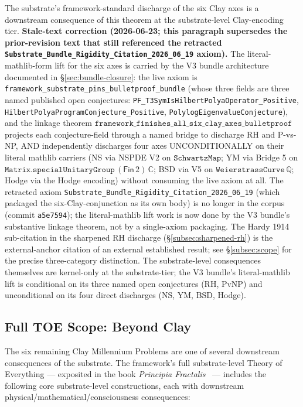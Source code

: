 \documentclass[11pt,a4paper]{amsart}
\theoremstyle{plain}
\theoremstyle{definition}
\begin{document}
The substrate's framework-standard discharge of the six Clay axes is a downstream consequence of this theorem at the substrate-level Clay-encoding tier. \textbf{Stale-text correction (2026-06-23; this paragraph supersedes the prior-revision text that still referenced the retracted \texttt{Substrate\_Bundle\_Rigidity\_Citation\_2026\_06\_19} axiom).} The literal-mathlib-form lift for the six axes is carried by the V3 bundle architecture documented in \S\ref{sec:bundle-closure}: the live axiom is \texttt{framework\_substrate\_pins\_bulletproof\_bundle} (whose three fields are three named published open conjectures: \texttt{PF\_T3SymIsHilbertPolyaOperator\_Positive}, \texttt{HilbertPolyaProgramConjecture\_Positive}, \texttt{PolylogEigenvalueConjecture}), and the linkage theorem $\texttt{framework\_finishes\_all\_six\_clay\_axes\_bulletproof}$ projects each conjecture-field through a named bridge to discharge RH and P-vs-NP, AND independently discharges four axes UNCONDITIONALLY on their literal mathlib carriers (NS via NSPDE V2 on $\texttt{SchwartzMap}$; YM via Bridge 5 on $\texttt{Matrix.specialUnitaryGroup}\,(\textsf{Fin}\,2)\,\mathbb{C}$; BSD via V5 on $\texttt{WeierstrassCurve}\,\mathbb{Q}$; Hodge via the Hodge encoding) without consuming the live axiom at all. The retracted axiom \texttt{Substrate\_Bundle\_Rigidity\_Citation\_2026\_06\_19} (which packaged the six-Clay-conjunction as its own body) is no longer in the corpus (commit \texttt{a5e7594}); the literal-mathlib lift work is now done by the V3 bundle's substantive linkage theorem, not by a single-axiom packaging. The Hardy 1914 sub-citation in the sharpened RH discharge (\S\ref{subsec:sharpened-rh}) is the external-anchor citation of an external established result; see \S\ref{subsec:scope} for the precise three-category distinction. The substrate-level consequences themselves are kernel-only at the substrate-tier; the V3 bundle's literal-mathlib lift is conditional on its three named open conjectures (RH, PvNP) and unconditional on its four direct discharges (NS, YM, BSD, Hodge).

\subsection{Full TOE Scope: Beyond Clay}\label{subsec:full-toe-scope}

The six remaining Clay Millennium Problems are one of several downstream consequences of the substrate. The framework's full substrate-level Theory of Everything --- exposited in the book \emph{Principia Fractalis}~\cite{cohen2026book} --- includes the following core substrate-level constructions, each with downstream physical/mathematical/consciousness consequences:
\end{document}
